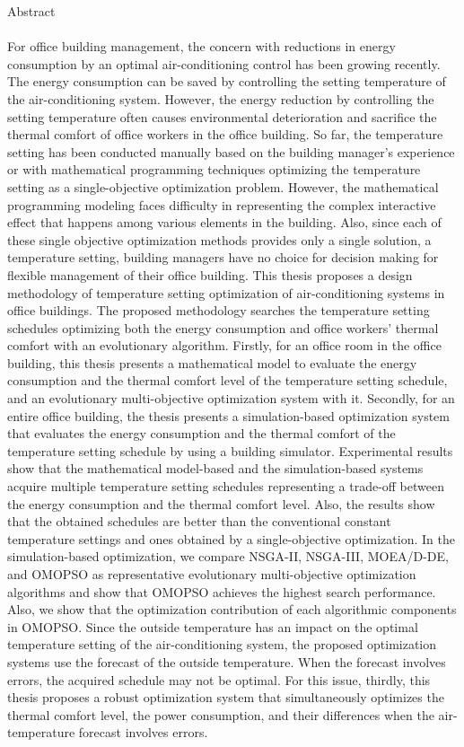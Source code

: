 \documentclass[a4paper, 12pt,dvipdfmx]{jsbook}
\begin{document}
\setcounter{page}{1} %
{\Huge Abstract}\\
\\
\hspace{1zw}For office building management, the concern with reductions in energy consumption by an optimal air-conditioning control has been growing recently. The energy consumption can be saved by controlling the setting temperature of the air-conditioning system. However, the energy reduction by controlling the setting temperature often causes environmental deterioration and sacrifice the thermal comfort of office workers in the office building. So far, the temperature setting has been conducted manually based on the building manager's experience or with mathematical programming techniques optimizing the temperature setting as a single-objective optimization problem. However, the mathematical programming modeling faces difficulty in representing the complex interactive effect that happens among various elements in the building. Also, since each of these single objective optimization methods provides only a single solution, a temperature setting, building managers have no choice for decision making for flexible management of their office building. This thesis proposes a design methodology of temperature setting optimization of air-conditioning systems in office buildings. The proposed methodology searches the temperature setting schedules optimizing both the energy consumption and office workers' thermal comfort with an evolutionary algorithm. Firstly, for an office room in the office building, this thesis presents a mathematical model to evaluate the energy consumption and the thermal comfort level of the temperature setting schedule, and an evolutionary multi-objective optimization system with it. Secondly, for an entire office building, the thesis presents a simulation-based optimization system that evaluates the energy consumption and the thermal comfort of the temperature setting schedule by using a building simulator. Experimental results show that the mathematical model-based and the simulation-based systems acquire multiple temperature setting schedules representing a trade-off between the energy consumption and the thermal comfort level. Also, the results show that the obtained schedules are better than the conventional constant temperature settings and ones obtained by a single-objective optimization. In the simulation-based optimization, we compare NSGA-II, NSGA-III, MOEA/D-DE, and OMOPSO as representative evolutionary multi-objective optimization algorithms and show that OMOPSO achieves the highest search performance.  Also, we show that the optimization contribution of each algorithmic components in OMOPSO. Since the outside temperature has an impact on the optimal temperature setting of the air-conditioning system, the proposed optimization systems use the forecast of the outside temperature. When the forecast involves errors, the acquired schedule may not be optimal. For this issue, thirdly, this thesis proposes a robust optimization system that simultaneously optimizes the thermal comfort level, the power consumption, and their differences when the air-temperature forecast involves errors. 
\end{document}
